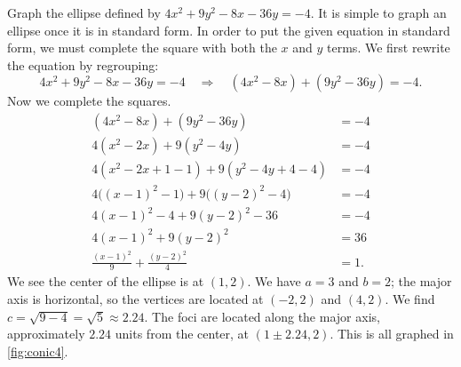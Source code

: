 \begin{example}\label{ex_conic4}%
Graph the ellipse defined by $4x^2+9y^2-8x-36y=-4$.
\solution
It is simple to graph an ellipse once it is in standard form. In order to put the given equation in standard form, we must complete the square with both the $x$ and $y$ terms. We first rewrite the equation by regrouping:
\[4x^2+9y^2-8x-36y=-4 \quad \Rightarrow \quad (4x^2-8x) + (9y^2-36y) = -4.\]
Now we complete the squares.
\begin{align*}
	(4x^2-8x) + (9y^2-36y) &= -4\\
	4(x^2-2x) + 9(y^2-4y) &= -4 \\
	4(x^2-2x +1 - 1) + 9(y^2-4y+4-4) &= - 4\\
	4\bigl((x-1)^2-1\bigr) + 9\bigl((y-2)^2-4\bigr) &= -4\\
	4(x-1)^2 -4 + 9(y-2)^2-36 &= -4 \\
	4(x-1)^2 + 9(y-2)^2 &= 36 \\
	\frac{(x-1)^2}{9} + \frac{(y-2)^2}{4} &= 1.
\end{align*}
%
%
%
We see the center of the ellipse is at $(1,2)$. We have $a=3$ and $b=2$; the major axis is horizontal, so the vertices are located at $(-2,2)$ and $(4,2)$. We find $c=\sqrt{9-4} = \sqrt{5}\approx 2.24.$ The foci are located along the major axis, approximately $2.24$ units from the center, at $(1\pm 2.24,2)$. This is all graphed in \autoref{fig:conic4}.
\end{example}

